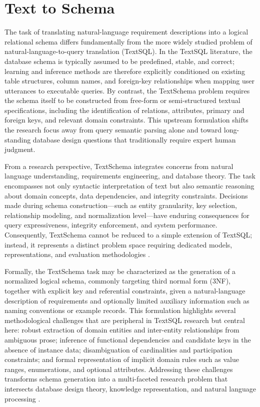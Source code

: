\section{Text to Schema}

The task of translating natural-language requirement descriptions into a logical relational schema differs fundamentally from the more widely studied problem of natural-language-to-query translation (Text\textrightarrow SQL). In the Text\textrightarrow SQL literature, the database schema is typically assumed to be predefined, stable, and correct; learning and inference methods are therefore explicitly conditioned on existing table structures, column names, and foreign-key relationships when mapping user utterances to executable queries. By contrast, the Text\textrightarrow Schema problem requires the schema itself to be constructed from free-form or semi-structured textual specifications, including the identification of relations, attributes, primary and foreign keys, and relevant domain constraints. This upstream formulation shifts the research focus away from query semantic parsing alone and toward long-standing database design questions that traditionally require expert human judgment.

From a research perspective, Text\textrightarrow Schema integrates concerns from natural language understanding, requirements engineering, and database theory. The task encompasses not only syntactic interpretation of text but also semantic reasoning about domain concepts, data dependencies, and integrity constraints. Decisions made during schema construction—such as entity granularity, key selection, relationship modeling, and normalization level—have enduring consequences for query expressiveness, integrity enforcement, and system performance. Consequently, Text\textrightarrow Schema cannot be reduced to a simple extension of Text\textrightarrow SQL; instead, it represents a distinct problem space requiring dedicated models, representations, and evaluation methodologies \cite{schemaagent2025}.

Formally, the Text\textrightarrow Schema task may be characterized as the generation of a normalized logical schema, commonly targeting third normal form (3NF), together with explicit key and referential constraints, given a natural-language description of requirements and optionally limited auxiliary information such as naming conventions or example records. This formulation highlights several methodological challenges that are peripheral in Text\textrightarrow SQL research but central here: robust extraction of domain entities and inter-entity relationships from ambiguous prose; inference of functional dependencies and candidate keys in the absence of instance data; disambiguation of cardinalities and participation constraints; and formal representation of implicit domain rules such as value ranges, enumerations, and optional attributes. Addressing these challenges transforms schema generation into a multi-faceted research problem that intersects database design theory, knowledge representation, and natural language processing \cite{schemaagent2025,vaswani17,brown20}.

